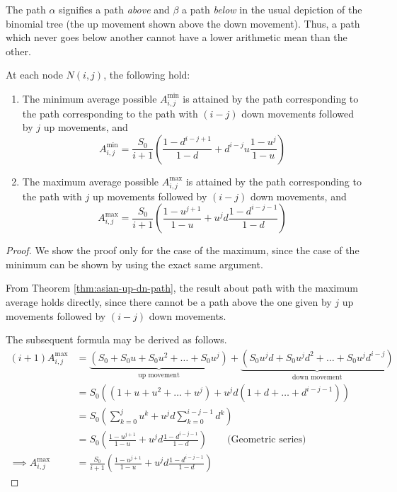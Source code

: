 \begin{rem}
	The path $\alpha$ signifies a path \emph{above} and $\beta$ a path \emph{below} in the usual depiction of the binomial tree (the up movement shown above the down movement). Thus, a path which never goes below another cannot have a lower arithmetic mean than the other.
\end{rem}


\begin{crr}
	\label{crr:asian-up-dn-path}
	At each node $ N(i,j) $, the following hold:
	\begin{enumerate}
	\item The minimum average possible $ A_{i,j}^{\min} $ is attained by the path corresponding to the path corresponding to the path with $(i-j)$ down movements followed by $j$ up movements, and
		\begin{equation}	\label{eq:asian-Amin}
			A_{i,j}^{\min} = \frac{S_0}{i+1} \left( \frac{1 - d^{i-j+1}}{1-d} + d^{i-j} u \frac{1 - u^{j}}{1-u} \right)
		\end{equation}
	\item The maximum average possible $ A_{i,j}^{\max} $ is attained by the path corresponding to the path with $j$ up movements followed by $(i-j)$ down movements, and
		\begin{equation} \label{eq:asian-Amax}
			A_{i,j}^{\max} = \frac{S_0}{i+1} \left( \frac{1 - u^{j+1}}{1-u} + u^{j} d \frac{1 - d^{i-j-1}}{1-d} \right)
		\end{equation}
	\end{enumerate}
\end{crr}

\begin{proof}
	We show the proof only for the case of the maximum, since the case of the minimum can be shown by using the exact same argument.
	
	From Theorem \ref{thm:asian-up-dn-path}, the result about path with the maximum average holds directly, since there cannot be a path above the one given by $j$ up movements followed by $(i-j)$ down movements.
	
	The subsequent formula may be derived as follows.
	\begin{align*}
		(i+1) A_{i,j}^{\max} &= \underbrace{ ( S_0 + S_0 u + S_0 u^2 + \dots + S_0 u^j ) }_\text{up movement} + \underbrace{ ( S_0 u^j d + S_0 u^j d^2 + \dots + S_0 u^j d^{i-j} ) }_\text{down movement} \\
		&= S_0 ( (1 + u + u^2 + \dots + u^j ) + u^j d ( 1 + d + \dots + d^{i-j-1} ) ) \\
		&= S_0 \left( \sum_{k=0}^j u^k + u^j d \sum_{k=0}^{i-j-1} d^k \right) \\
		&= S_0 \left( \frac{1 - u^{j+1}}{1-u} + u^{j} d \frac{1 - d^{i-j-1}}{1-d} \right) \qquad \text{(Geometric series)} \\
		\implies A_{i,j}^{\max} &= \frac{S_0}{i+1} \left( \frac{1 - u^{j+1}}{1-u} + u^{j} d \frac{1 - d^{i-j-1}}{1-d} \right)
	\end{align*}
\end{proof}

